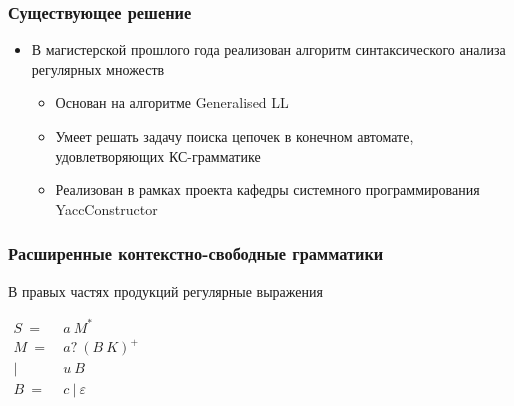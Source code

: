 \documentclass{beamer}
\begin{document}
 \begin{frame}
     \frametitle{Существующее решение}
     \begin{itemize}
         \item В магистерской прошлого года реализован алгоритм синтаксического анализа регулярных множеств
         \begin{itemize}
            \item Основан на алгоритме Generalised LL
            \item Умеет решать задачу поиска цепочек в конечном автомате, удовлетворяющих КС-грамматике
            \item Реализован в рамках проекта кафедры системного программирования YaccConstructor
         \end{itemize}
         
     \end{itemize}
 \end{frame}
	\begin{frame} 
		\frametitle{Расширенные контекстно-свободные грамматики}
		\begin{center}
		В правых частях продукций регулярные выражения
		\end{center}
		\begin{center}
			{$\begin{aligned}
				S\ =&\ a\ M^* \\
				M\ =&\ a?\ (B\ K)^+ \\
				|&\ u\ B \\
				B\ =&\ c\ |\ \varepsilon
				\end{aligned}$}
		\end{center}
	\end{frame}
	
\end{document}
